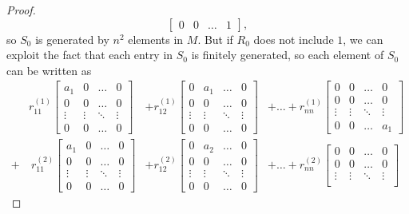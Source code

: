 \documentclass{article}
\begin{document}
\begin{proof}
\[\begin{bmatrix}
      0 & 0 & \hdots & 1
    \end{bmatrix},
  \] so $S_0$ is generated by $n^2$ elements in $M$.
  But if $R_0$ does not include $1$, we can exploit the fact that each entry in
  $S_0$ is finitely generated, so each element of $S_0$ can be written as \begin{align*}
    &r_{11}^{(1)} \begin{bmatrix}
      a_1 & 0 & \hdots & 0 \\
      0 & 0 & \hdots & 0 \\
      \vdots & \vdots & \ddots & \vdots \\
      0 & 0 & \hdots & 0
    \end{bmatrix}
    & + r_{12}^{(1)} \begin{bmatrix}
      0 & a_1 & \hdots & 0 \\
      0 & 0 & \hdots & 0 \\
      \vdots & \vdots & \ddots & \vdots \\
      0 & 0 & \hdots & 0
    \end{bmatrix}
    & + \hdots + r_{nn}^{(1)} \begin{bmatrix}
      0 & 0 & \hdots & 0 \\
      0 & 0 & \hdots & 0 \\
      \vdots & \vdots & \ddots & \vdots \\
      0 & 0 & \hdots & a_1
    \end{bmatrix} \\
    + &\ r_{11}^{(2)} \begin{bmatrix}
      a_1 & 0 & \hdots & 0 \\
      0 & 0 & \hdots & 0 \\
      \vdots & \vdots & \ddots & \vdots \\
      0 & 0 & \hdots & 0
    \end{bmatrix}
    & + r_{12}^{(2)} \begin{bmatrix}
      0 & a_2 & \hdots & 0 \\
      0 & 0 & \hdots & 0 \\
      \vdots & \vdots & \ddots & \vdots \\
      0 & 0 & \hdots & 0
    \end{bmatrix}
    & + \hdots + r_{nn}^{(2)} \begin{bmatrix}
      0 & 0 & \hdots & 0 \\
      0 & 0 & \hdots & 0 \\
      \vdots & \vdots & \ddots & \vdots \\

\end{bmatrix}
\end{align*}
\end{proof}
\end{document}
